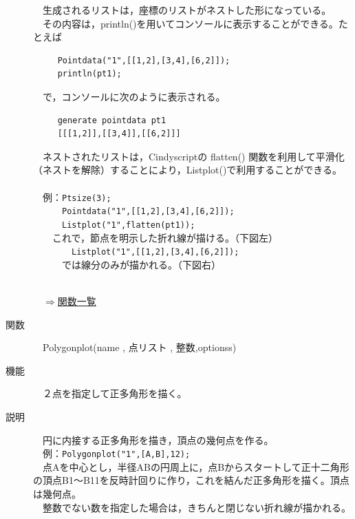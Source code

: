 \documentclass[papersize,a4paper,12pt,uplatex]{jsarticle}
\begin{document}
\begin{description}
 　生成されるリストは，座標のリストがネストした形になっている。\\
 　その内容は，println()を用いてコンソールに表示することができる。たとえば
 \begin{verbatim}
　　　Pointdata("1",[[1,2],[3,4],[6,2]]);
　　　println(pt1);
\end{verbatim}
 　で，コンソールに次のように表示される。
\begin{verbatim}
　　　generate pointdata pt1 
　　　[[[1,2]],[[3,4]],[[6,2]]] 
\end{verbatim}
　ネストされたリストは，Cindyscriptの flatten() 関数を利用して平滑化（ネストを解除）することにより，Listplot()で利用することができる。\\
　\\
　例：\verb|Ptsize(3);|\\
　　　\verb|Pointdata("1",[[1,2],[3,4],[6,2]]);|\\
　　　\verb|Listplot("1",flatten(pt1));|\\
　　これで，節点を明示した折れ線が描ける。（下図左）\\
　　　　\verb|Listplot("1",[[1,2],[3,4],[6,2]]);|\\
　　　では線分のみが描かれる。（下図右）\\
 　　　\\
\begin{flushright}　\hyperlink{functionlist}{$\Rightarrow$関数一覧}\end{flushright}

\hypertarget{polygonplot}{}
\item[関数]　Polygonplot(name , 点リスト , 整数,optionss)
\item[機能]　２点を指定して正多角形を描く。
\item[説明]　円に内接する正多角形を描き，頂点の幾何点を作る。\\
　例：\verb|Polygonplot("1",[A,B],12);|\\
　点Aを中心とし，半径ABの円周上に，点Bからスタートして正十二角形の頂点B1〜B11を反時計回りに作り，これを結んだ正多角形を描く。頂点は幾何点。\\
　整数でない数を指定した場合は，きちんと閉じない折れ線が描かれる。\\



\end{description}
\end{document}
